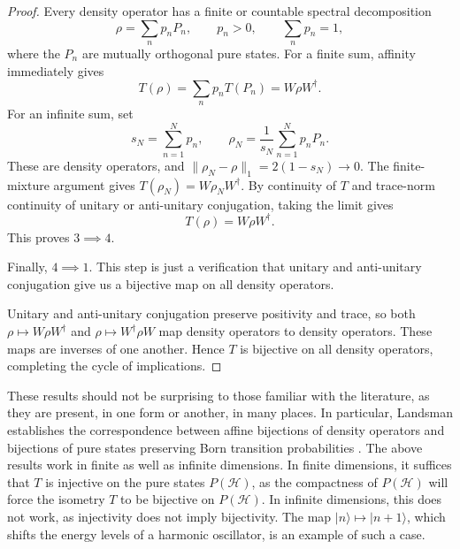 \documentclass[entropy,article,submit,moreauthors]{Definitions/mdpi}
\def\>{\rangle}
\begin{document}
\begin{proof}
	Every density operator has a finite or countable spectral
	decomposition
	\begin{equation}
		\rho=\sum_n p_nP_n,
		\qquad
		p_n>0,
		\qquad
		\sum_n p_n=1,
	\end{equation}
	where the $P_n$ are mutually orthogonal pure states. For a finite sum, affinity immediately gives
	\begin{equation}
		T(\rho)
		=\sum_n p_nT(P_n)
		=W\rho W^\dagger.
	\end{equation}
	For an infinite sum, set
	\begin{equation}
		s_N=\sum_{n=1}^{N}p_n,
		\qquad
		\rho_N=\frac{1}{s_N}\sum_{n=1}^{N}p_nP_n.
	\end{equation}
	These are density operators, and
	$\|\rho_N-\rho\|_1=2(1-s_N)\to0$.
	The finite-mixture argument gives
	$T(\rho_N)=W\rho_NW^\dagger$.
	By continuity of $T$ and trace-norm continuity of unitary
	or anti-unitary conjugation, taking the limit gives
	\begin{equation}
		T(\rho)=W\rho W^\dagger.
	\end{equation}
	This proves $3\implies4$.
	
	Finally, $4\implies1$. This step is just a verification that unitary and anti-unitary conjugation give us a bijective map on all density operators.
	
	Unitary and anti-unitary conjugation preserve positivity and trace, so both $\rho\mapsto W\rho W^\dagger$ and $\rho\mapsto W^\dagger\rho W$ map density operators to density operators. These maps are inverses of one another. Hence $T$ is bijective on all density operators, completing the cycle of implications.
\end{proof}

These results should not be surprising to those familiar with the literature, as they are present, in one form or another, in many places. In particular, Landsman establishes the correspondence between affine bijections of density operators and bijections of pure states preserving Born transition probabilities \cite[Proposition~5.15]{Landsman2017}. The above results work in finite as well as infinite dimensions. In finite dimensions, it suffices that $T$ is injective on the pure states $P(\mathcal{H})$, as the compactness of $P(\mathcal{H})$ will force the isometry $T$ to be bijective on $P(\mathcal{H})$. In infinite dimensions, this does not work, as injectivity does not imply bijectivity. The map $|n\> \mapsto |n+1\>$, which shifts the energy levels of a harmonic oscillator, is an example of such a case.
\end{document}
